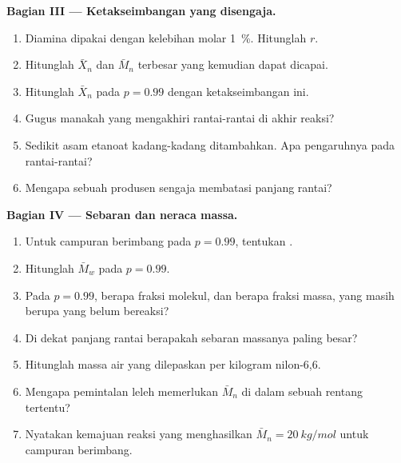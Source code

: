 \begin{problem}
\medskip
\noindent\textbf{Bagian III --- Ketakseimbangan yang disengaja.}
\begin{enumerate}[resume]
  \item Diamina dipakai dengan kelebihan molar 1~\%. Hitunglah $r$.
  \item Hitunglah $\bar X_n$ dan $\bar M_n$ terbesar yang kemudian dapat dicapai.
  \item Hitunglah $\bar X_n$ pada $p = 0.99$ dengan ketakseimbangan ini.
  \item Gugus manakah yang mengakhiri rantai-rantai di akhir reaksi?
  \item Sedikit asam etanoat kadang-kadang ditambahkan. Apa pengaruhnya pada rantai-rantai?
  \item Mengapa sebuah produsen sengaja membatasi panjang rantai?
\end{enumerate}

\medskip
\noindent\textbf{Bagian IV --- Sebaran dan neraca massa.}
\begin{enumerate}[resume]
  \item Untuk campuran berimbang pada $p = 0.99$, tentukan .
  \item Hitunglah $\bar M_w$ pada $p = 0.99$.
  \item Pada $p = 0.99$, berapa fraksi molekul, dan berapa fraksi massa,
        yang masih berupa  yang belum bereaksi?
  \item Di dekat panjang rantai berapakah sebaran massanya paling besar?
  \item Hitunglah massa air yang dilepaskan per kilogram nilon-6,6.
  \item Mengapa pemintalan leleh memerlukan $\bar M_n$ di dalam sebuah rentang tertentu?
  \item Nyatakan kemajuan reaksi yang menghasilkan $\bar M_n = \qty{20}{kg/mol}$
        untuk campuran berimbang.
\end{enumerate}
\end{problem}
